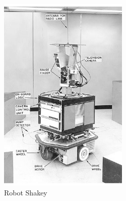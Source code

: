 \begin{figure}[ht!]
	\centering
	\begin{minipage}{0.35\linewidth}
		\centering
		\includegraphics[width=\linewidth]{figs/shakey.png}
		\caption*{\centering Robot Shakey}  %
	\end{minipage}
	\hspace{2cm}
	\begin{minipage}{0.49\linewidth}
		\centering

\end{minipage}
\end{figure}
